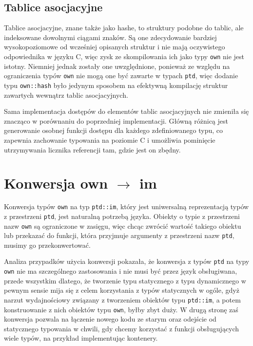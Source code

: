 \documentclass[licencjacka]{pracamgr}
\begin{document}
\subsection{Tablice asocjacyjne}
Tablice asocjacyjne, znane także jako hashe, to struktury podobne do tablic, ale indeksowane dowolnymi
ciągami znaków. Są one zdecydowanie bardziej wysokopoziomowe od wcześniej opisanych struktur i nie mają
oczywistego odpowiednika w języku C, więc zysk ze skompilowania ich jako typy \texttt{own} nie jest istotny.
Niemniej jednak zostały one uwzględnione, ponieważ ze względu na ograniczenia typów \texttt{own} nie mogą
one być zawarte w typach \texttt{ptd}, więc dodanie typu \texttt{own::hash} było jedynym sposobem na efektywną
kompilację struktur zawartych wewnątrz tablic asocjacyjnych.

Sama implementacja dostępów do elementów tablic asocjacyjnych nie zmieniła się znacząco w porównaniu
do poprzedniej implementacji. Główną różnicą jest generowanie osobnej funkcji dostępu dla każdego zdefiniowanego
typu, co zapewnia zachowanie typowania na poziomie C i umożliwia pominięcie utrzymywania licznika referencji
tam, gdzie jest on zbędny.

\section{Konwersja own $\rightarrow$ im}
\label{sec:own_to_im}
Konwersja typów \texttt{own} na typ \texttt{ptd::im}, który jest uniwersalną reprezentacją typów z przestrzeni \texttt{ptd},
jest naturalną potrzebą języka. Obiekty o typie z przestrzeni nazw \texttt{own} są ograniczone w zasięgu,
więc chcąc zwrócić wartość takiego obiektu lub przekazać do funkcji, która przyjmuje argumenty z przestrzeni
nazw \texttt{ptd}, musimy go przekonwertować.

Analiza przypadków użycia konwersji pokazała, że konwersja z typów \texttt{ptd} na typy \texttt{own} nie ma 
szczególnego zastosowania i nie musi być przez język obsługiwana, przede wszystkim dlatego,
że tworzenie typu statycznego z typu dynamicznego w pewnym sensie mija się z celem korzystania z typów statycznych w ogóle,
gdyż narzut wydajnościowy związany z tworzeniem obiektów typu \texttt{ptd::im}, a potem konstruowanie z nich obiektów typu \texttt{own}, byłby zbyt duży.
W drugą stronę zaś konwersja pozwala na łączenie nowego kodu ze starym oraz odejście od statycznego typowania w chwili,
gdy chcemy korzystać z funkcji obsługujących wiele typów, na przykład implementując kontenery.
\end{document}

